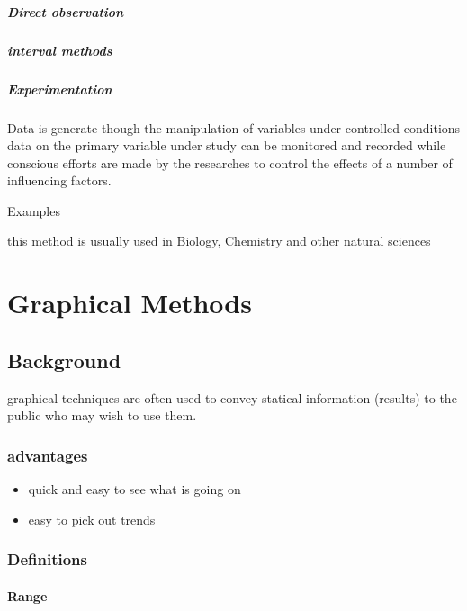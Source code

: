 \documentclass[]{article}
\providecommand{\tightlist}{%
  \setlength{\itemsep}{0pt}\setlength{\parskip}{0pt}}
\let\oldparagraph\paragraph
\renewcommand{\paragraph}[1]{\oldparagraph{#1}\mbox{}}
\let\oldsubparagraph\subparagraph
\renewcommand{\subparagraph}[1]{\oldsubparagraph{#1}\mbox{}}
\begin{document}
\hypertarget{direct-observation}{%
\subparagraph{Direct observation}\label{direct-observation}}

\hypertarget{interval-methods}{%
\subparagraph{interval methods}\label{interval-methods}}

\hypertarget{experimentation}{%
\subparagraph{Experimentation}\label{experimentation}}

Data is generate though the manipulation of variables under controlled
conditions data on the primary variable under study can be monitored and
recorded while conscious efforts are made by the researches to control
the effects of a number of influencing factors.

Examples

this method is usually used in Biology, Chemistry and other natural
sciences

\hypertarget{graphical-methods}{%
\section{Graphical Methods}\label{graphical-methods}}

\hypertarget{background}{%
\subsection{Background}\label{background}}

graphical techniques are often used to convey statical information
(results) to the public who may wish to use them.

\hypertarget{advantages}{%
\subsubsection{advantages}\label{advantages}}

\begin{itemize}
\tightlist
\item
  quick and easy to see what is going on
\item
  easy to pick out trends
\end{itemize}

\hypertarget{definitions-1}{%
\subsubsection{Definitions}\label{definitions-1}}

\hypertarget{range-1}{%
\paragraph{Range}\label{range-1}}
\end{document}
